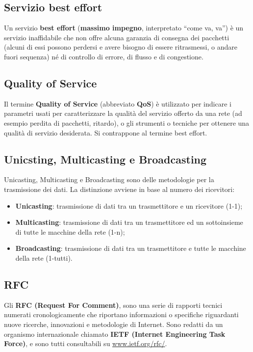\documentclass{article}
\begin{document}
        \subsection{Servizio best effort}
        Un servizio \textbf{best effort} (\textbf{massimo impegno}, interpretato “come va, va”) è un servizio
        inaffidabile che non offre alcuna garanzia di consegna dei pacchetti (alcuni di essi possono
        perdersi e avere bisogno di essere ritrasmessi, o andare fuori sequenza) né di controllo di
        errore, di flusso e di congestione.

        \subsection{Quality of Service}
        Il termine \textbf{Quality of Service} (abbreviato \textbf{QoS}) è utilizzato per indicare i parametri usati per
        caratterizzare la qualità del servizio offerto da una rete (ad esempio perdita di pacchetti,
        ritardo), o gli strumenti o tecniche per ottenere una qualità di servizio desiderata. Si
        contrappone al termine best effort.

        \subsection{Unicsting, Multicasting e Broadcasting}
        Unicasting, Multicasting e Broadcasting sono delle metodologie per la trasmissione dei dati.
        La distinzione avviene in base al numero dei ricevitori:

        \begin{itemize}
            \item \textbf{Unicasting}: trasmissione di dati tra un trasmettitore e un ricevitore (1-1);
            \item \textbf{Multicasting}: trasmissione di dati tra un trasmettitore ed un sottoinsieme di tutte le macchine della rete (1-n);
            \item \textbf{Broadcasting}: trasmissione di dati tra un trasmettitore e tutte le macchine della rete (1-tutti).
        \end{itemize}

        \subsection{RFC}
        Gli \textbf{RFC (Request For Comment)}, sono una serie di rapporti tecnici numerati
        cronologicamente che riportano informazioni o specifiche riguardanti nuove ricerche,
        innovazioni e metodologie di Internet. Sono redatti da un organismo internazionale chiamato
        \textbf{IETF (Internet Engineering Task Force)}, e sono tutti consultabili su \url{www.ietf.org/rfc/}.
\end{document}
